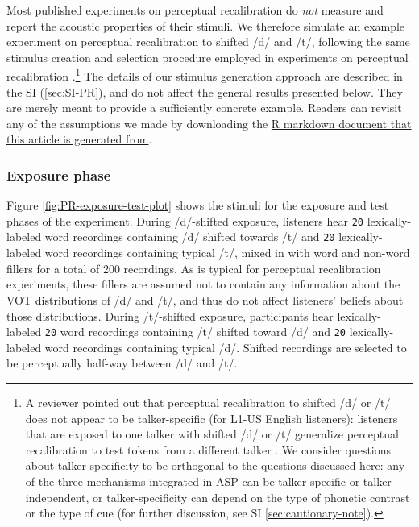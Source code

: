 \documentclass[
  11pt,
  man,floatsintext]{apa6}
\begin{document}
Most published experiments on perceptual recalibration do \emph{not} measure and report the acoustic properties of their stimuli. We therefore simulate an example experiment on perceptual recalibration to shifted /d/ and /t/, following the same stimulus creation and selection procedure employed in experiments on perceptual recalibration \autocite[e.g.,][]{kraljic-samuel2006}.\footnote{A reviewer pointed out that perceptual recalibration to shifted /d/ or /t/ does not appear to be talker-specific (for L1-US English listeners): listeners that are exposed to one talker with shifted /d/ or /t/ generalize perceptual recalibration to test tokens from a different talker \autocite[unlike for shifted /s/ or //, e.g.,][]{kraljic-samuel2007}. We consider questions about talker-specificity to be orthogonal to the questions discussed here: any of the three mechanisms integrated in ASP can be talker-specific or talker-independent, or talker-specificity can depend on the type of phonetic contrast or the type of cue (for further discussion, see SI \ref{sec:cautionary-note}).} The details of our stimulus generation approach are described in the SI (\ref{sec:SI-PR}), and do not affect the general results presented below. They are merely meant to provide a sufficiently concrete example. Readers can revisit any of the assumptions we made by downloading the \href{https://osf.io/q7gjp/}{R markdown document that this article is generated from}.

\hypertarget{exposure-phase}{%
\subsubsection{Exposure phase}\label{exposure-phase}}

Figure \ref{fig:PR-exposure-test-plot} shows the stimuli for the exposure and test phases of the experiment. During /d/-shifted exposure, listeners hear \texttt{20} lexically-labeled word recordings containing /d/ shifted towards /t/ and \texttt{20} lexically-labeled word recordings containing typical /t/, mixed in with word and non-word fillers for a total of 200 recordings. As is typical for perceptual recalibration experiments, these fillers are assumed not to contain any information about the VOT distributions of /d/ and /t/, and thus do not affect listeners' beliefs about those distributions. During /t/-shifted exposure, participants hear lexically-labeled \texttt{20} word recordings containing /t/ shifted toward /d/ and \texttt{20} lexically-labeled word recordings containing typical /d/. Shifted recordings are selected to be perceptually half-way between /d/ and /t/.
\end{document}
